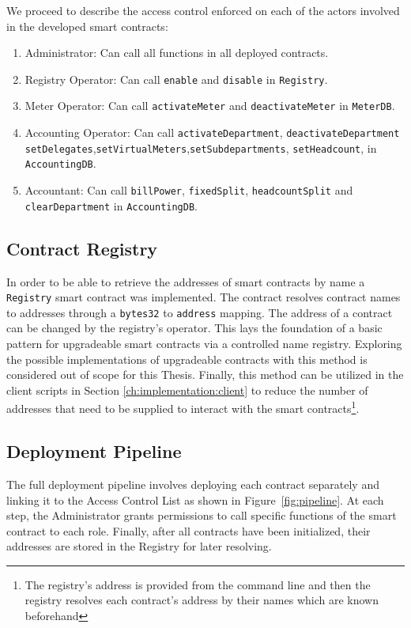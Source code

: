 We proceed to describe the access control enforced on each of the actors involved in the developed smart contracts:
\begin{enumerate}
    \item Administrator: Can call all functions in all deployed contracts.
    \item Registry Operator: Can call \texttt{enable} and \texttt{disable} in \texttt{Registry}.
    \item Meter Operator: Can call \texttt{activateMeter} and \texttt{deactivateMeter} in \texttt{MeterDB}.
    \item Accounting Operator: Can call \texttt{activateDepartment}, \texttt{deactivateDepartment} \texttt{setDelegates},\texttt{setVirtualMeters},\texttt{setSubdepartments},   \texttt{setHeadcount}, in \texttt{AccountingDB}.
    \item Accountant: Can call \texttt{billPower}, \texttt{fixedSplit}, \texttt{headcountSplit} and \texttt{clearDepartment} in \texttt{AccountingDB}.
\end{enumerate}

\subsection{Contract Registry} 

In order to be able to retrieve the addresses of smart contracts by name a \texttt{Registry} smart contract was implemented. The contract resolves contract names to addresses through a \texttt{bytes32} to \texttt{address} mapping. The address of a contract can be changed by the registry's operator. This lays the foundation of a basic pattern for upgradeable smart contracts via a controlled name registry. Exploring the possible implementations of upgradeable contracts with this method is considered out of scope for this Thesis. Finally, this method can be utilized in the client scripts in Section \ref{ch:implementation:client} to reduce the number of addresses that need to be supplied to interact with the smart contracts\footnote{The registry's address is provided from the command line and then the registry resolves each contract's address by their names which are known beforehand}.

\subsection{Deployment Pipeline}

The full deployment pipeline involves deploying each contract separately and linking it to the Access Control List as shown in Figure~\ref{fig:pipeline}. At each step, the Administrator grants permissions to call specific functions of the smart contract to each role. Finally, after all contracts have been initialized, their addresses are stored in the Registry for later resolving.


